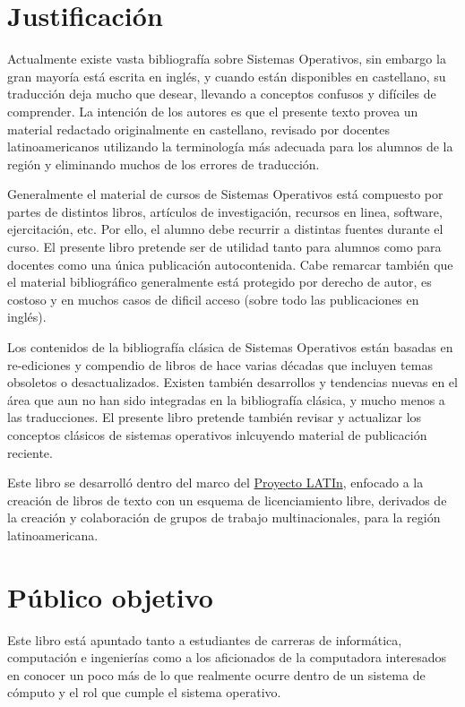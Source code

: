 \documentclass[11pt,fleqn]{book} %
\begin{document}
\section*{Justificación}

Actualmente existe vasta bibliografía sobre Sistemas Operativos, sin
embargo la gran mayoría está escrita en inglés, y cuando están
disponibles en castellano, su traducción deja mucho que desear,
llevando a conceptos confusos y difíciles de comprender. La intención
de los autores es que el presente texto provea un material redactado
originalmente en castellano, revisado por docentes latinoamericanos
utilizando la terminología más adecuada para los alumnos de la región
y eliminando muchos de los errores de traducción.

Generalmente el material de cursos de Sistemas Operativos está
compuesto por partes de distintos libros, artículos de investigación,
recursos en linea, software, ejercitación, etc. Por ello, el alumno
debe recurrir a distintas fuentes durante el curso. El presente
libro pretende ser de utilidad tanto para alumnos como para
docentes como una única publicación autocontenida. Cabe remarcar
también que el material bibliográfico generalmente está protegido por
derecho de autor, es costoso y en muchos casos de dificil acceso
(sobre todo las publicaciones en inglés).

Los contenidos de la bibliografía clásica de Sistemas Operativos están
basadas en re-ediciones y compendio de libros de hace varias décadas
que incluyen temas obsoletos o desactualizados. Existen también
desarrollos y tendencias nuevas en el área que aun no han sido
integradas en la bibliografía clásica, y mucho menos a las
traducciones. El presente libro pretende también revisar y actualizar
los conceptos clásicos de sistemas operativos inlcuyendo material de
publicación reciente.

Este libro se desarrolló dentro del marco del \href{http://www.latinproject.org}{Proyecto LATIn}, enfocado a
la creación de libros de texto con un esquema de licenciamiento libre,
derivados de la creación y colaboración de grupos de trabajo
multinacionales, para la región latinoamericana.


\section*{Público objetivo}

Este libro está apuntado tanto a estudiantes de carreras de informática, 
computación e ingenierías como a los aficionados de la computadora
interesados en conocer un poco más de lo que realmente ocurre dentro 
de un sistema de cómputo y el rol que cumple el sistema operativo.
\end{document}
